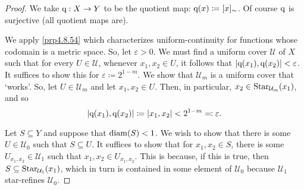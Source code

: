 \begin{thm}
\begin{savenotes}
\begin{proof}
We take $\mathrm{q} :X\rightarrow Y$ to be the quotient map:  $\mathrm{q} (x)\coloneqq [x]_{\sim}$.  Of course $\mathrm{q}$ is surjective (all quotient maps are).

We apply \cref{prp4.8.54} which characterizes uniform-continuity for functions whose codomain is a metric space.  So, let $\varepsilon >0$.  We must find a uniform cover $\mathcal{U}$ of $X$ such that for every $U\in \mathcal{U}$, whenever $x_1,x_2\in U$, it follows that $\metric[\q (x_1)][\q (x_2)]<\varepsilon$.  It suffices to show this for $\varepsilon \coloneqq 2^{1-m}$.  We show that $\mathcal{U}_m$ is a uniform cover that `works'.  So, let $U\in \mathcal{U}_m$ and let $x_1,x_2\in U$.   Then, in particular, $x_2\in \operatorname{Star} _{\mathcal{U}_m}(x_1)$, and so
\begin{equation}
\metric[\q (x_1)][\q (x_2)]\coloneqq \metric[x_1][x_2]<2^{1-m}\eqqcolon \varepsilon .
\end{equation}

Let $S\subseteq Y$ and suppose that $\operatorname{diam} (S)<1$.  We wish to show that there is some $U\in \mathcal{U}_0$ such that $S\subseteq U$.  It suffices to show that for $x_1,x_2\in S$, there is some $U_{x_1,x_2}\in \mathcal{U}_1$ such that $x_1,x_2\in U_{x_1,x_2}$.  This is because, if this is true, then $S\subseteq \operatorname{Star} _{\mathcal{U}_1}(x_1)$, which in turn is contained in some element of $\mathcal{U}_0$ because $\mathcal{U}_1$ star-refines $\mathcal{U}_0$.


\end{proof}
\end{savenotes}
\end{thm}
